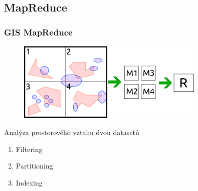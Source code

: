 \documentclass[unicode,bookmarksnumbered]{beamer}
\begin{document}
	\subsection{MapReduce}
	\begin{frame}
	\frametitle{GIS MapReduce}
		\begin{figure}
			\centering
			\includegraphics[width=0.8\textwidth]{./img/spatial/mapred_spatial.pdf}
		\end{figure}
		Analýza prostorového vztahu dvou datasetů
		\begin{enumerate}
			\item Filtering 
			\item Partitioning
			\item Indexing
		\end{enumerate}
	\end{frame}
%


	
\end{document}
